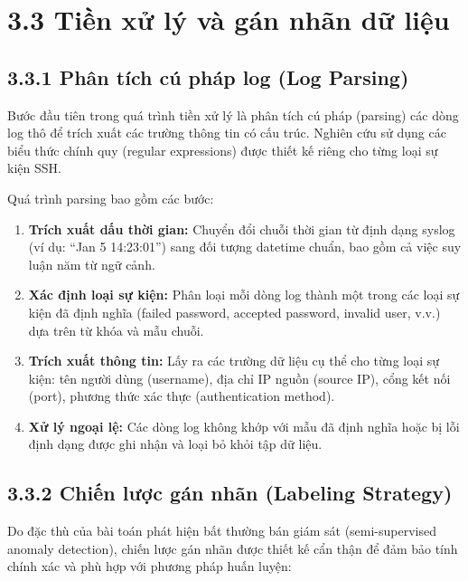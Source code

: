 \documentclass[
  a4paper]{report}
\providecommand{\tightlist}{%
  \setlength{\itemsep}{0pt}\setlength{\parskip}{0pt}}
\begin{document}
\section{3.3 Tiền xử lý và gán nhãn dữ
liệu}\label{tiux1ec1n-xux1eed-luxfd-vuxe0-guxe1n-nhuxe3n-dux1eef-liux1ec7u}

\subsection{3.3.1 Phân tích cú pháp log (Log
Parsing)}\label{phuxe2n-tuxedch-cuxfa-phuxe1p-log-log-parsing}

Bước đầu tiên trong quá trình tiền xử lý là phân tích cú pháp (parsing)
các dòng log thô để trích xuất các trường thông tin có cấu trúc. Nghiên
cứu sử dụng các biểu thức chính quy (regular expressions) được thiết kế
riêng cho từng loại sự kiện SSH.

Quá trình parsing bao gồm các bước:

\begin{enumerate}
\def\labelenumi{\arabic{enumi}.}
\tightlist
\item
  \textbf{Trích xuất dấu thời gian:} Chuyển đổi chuỗi thời gian từ định
  dạng syslog (ví dụ: ``Jan 5 14:23:01'') sang đối tượng datetime chuẩn,
  bao gồm cả việc suy luận năm từ ngữ cảnh.
\item
  \textbf{Xác định loại sự kiện:} Phân loại mỗi dòng log thành một trong
  các loại sự kiện đã định nghĩa (failed password, accepted password,
  invalid user, v.v.) dựa trên từ khóa và mẫu chuỗi.
\item
  \textbf{Trích xuất thông tin:} Lấy ra các trường dữ liệu cụ thể cho
  từng loại sự kiện: tên người dùng (username), địa chỉ IP nguồn (source
  IP), cổng kết nối (port), phương thức xác thực (authentication
  method).
\item
  \textbf{Xử lý ngoại lệ:} Các dòng log không khớp với mẫu đã định nghĩa
  hoặc bị lỗi định dạng được ghi nhận và loại bỏ khỏi tập dữ liệu.
\end{enumerate}

\subsection{3.3.2 Chiến lược gán nhãn (Labeling
Strategy)}\label{chiux1ebfn-lux1b0ux1ee3c-guxe1n-nhuxe3n-labeling-strategy}

Do đặc thù của bài toán phát hiện bất thường bán giám sát
(semi-supervised anomaly detection), chiến lược gán nhãn được thiết kế
cẩn thận để đảm bảo tính chính xác và phù hợp với phương pháp huấn
luyện:
\end{document}

